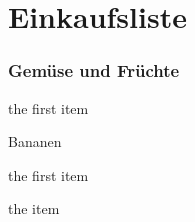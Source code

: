 \documentclass[11pt,a4paper]{article}%
\begin{document}
\section*{Einkaufsliste}%
\label{sec:Einkaufsliste}%

%
\setlength%
\columnsep{40pt}%
\subsubsection*{Gemüse und Früchte}%
\label{ssubsec:GemseundFrchte}%

%
\begin{multicols}{2}
\small
\begin{description}[leftmargin=1.75cm, itemsep=4pt]%
\setlength{\itemsep}{0pt}%
\setlength{\parskip}{0pt}%
\item[100g]%
the first item%
\item[23 Stk.]%
Bananen%
\item[100g]%
the first item%
\item[10g]%
the item%
\end{description}
\end{multicols}%
\newpage%
\end{document}
